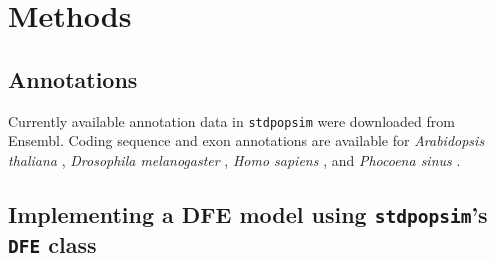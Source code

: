 \documentclass[hidelinks]{article}
\newcommand{\stdpopsim}{\texttt{stdpopsim}\xspace}
\begin{document}
\section*{Methods}
    \label{methods}

    \subsection*{Annotations}
    Currently available annotation data in \stdpopsim were downloaded from Ensembl.
    Coding sequence and exon annotations are available for
    \textit{Arabidopsis thaliana} \citep{cheng2017araport},
    \textit{Drosophila melanogaster} \citep{hoskins2015release},
    \textit{Homo sapiens} \citep{hunt2018ensembl},
    and \textit{Phocoena sinus} \citep[vaquita porpoise,][]{morin2021}.

    \subsection*{Implementing a DFE model using \stdpopsim's \texttt{DFE} class}
    
\end{document}

